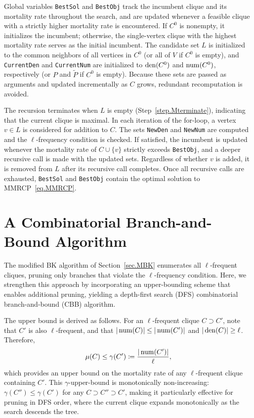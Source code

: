 Global variables \texttt{BestSol} and \texttt{BestObj} track the
incumbent clique and its mortality rate throughout the search, and are
updated whenever a feasible clique with a strictly higher mortality
rate is encountered. If $C^0$ is nonempty, it initializes the
incumbent; otherwise, the single-vertex clique with the highest
mortality rate serves as the initial incumbent. The candidate set $L$
is initialized to the common neighbors of all vertices in $C^0$ (or
all of $V$ if $C^0$ is empty), and \texttt{CurrentDen} and
\texttt{CurrentNum} are initialized to $\operatorname*{den}(C^0)$ and $\operatorname*{num}(C^0)$,
respectively (or $P$ and $\widetilde{P}$ if $C^0$ is empty). Because
these sets are passed as arguments and updated incrementally as $C$
grows, redundant recomputation is avoided.

The recursion terminates when $L$ is empty
(Step~\ref{step.Mterminate}), indicating that the current clique is
maximal. In each iteration of the for-loop, a vertex $v \in L$ is
considered for addition to $C$. The sets \texttt{NewDen} and
\texttt{NewNum} are computed and the $\ell$-frequency condition is
checked. If satisfied, the incumbent is updated whenever the mortality
rate of $C \cup \{v\}$ strictly exceeds \texttt{BestObj}, and a
deeper recursive call is made with the updated sets. Regardless of
whether $v$ is added, it is removed from $L$ after its recursive call
completes. Once all recursive calls are exhausted, \texttt{BestSol}
and \texttt{BestObj} contain the optimal solution to
MMRCP~\eqref{eq.MMRCP}.

\section{A Combinatorial Branch-and-Bound
Algorithm}\label{sec.CBB}

The modified BK algorithm of Section~\ref{sec.MBK} enumerates all
$\ell$-frequent cliques, pruning only branches that violate the
$\ell$-frequency condition. Here, we strengthen this approach by
incorporating an upper-bounding scheme that enables additional
pruning, yielding a depth-first search (DFS) combinatorial
branch-and-bound (CBB) algorithm.

The upper bound is derived as follows. For an $\ell$-frequent clique
$C \supset C'$, note that $C'$ is also $\ell$-frequent, and that
$|\operatorname*{num}(C)| \le |\operatorname*{num}(C')|$ and $|\operatorname*{den}(C)| \ge \ell$. Therefore,
\begin{equation}\label{eq.gammaC}
    \mu(C) \le \gamma(C') \coloneqq \frac{|\operatorname*{num}(C')|}{\ell},
\end{equation}
which provides an upper bound on the mortality rate of any
$\ell$-frequent clique containing $C'$. This $\gamma$-upper-bound is
monotonically non-increasing: $\gamma(C'') \le \gamma(C')$ for any
$C \supset C'' \supset C'$, making it particularly effective for
pruning in DFS order, where the current clique expands monotonically
as the search descends the tree.

